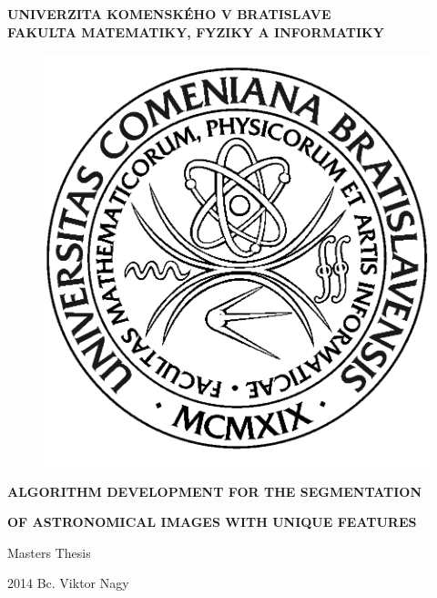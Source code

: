 \documentclass[12pt, a4paper, oneside]{book}
\newcommand\mfthesistype{Masters Thesis}
\newcommand\mfauthor{Bc. Viktor Nagy}
\newcommand\mfuniversity{UNIVERZITA KOMENSKÉHO V BRATISLAVE}
\newcommand\mffaculty{FAKULTA MATEMATIKY, FYZIKY A INFORMATIKY}
\begin{document}
\frontmatter

\thispagestyle{empty}

\noindent
\begin{minipage}{\textwidth}
\begin{center}
\textbf{\mfuniversity \\
\mffaculty}
\end{center}
\end{minipage}

\vfill
\begin{figure}[!hbt]
    \begin{center}
        \includegraphics{images/logo_fmph}
        \label{img:logo}
    \end{center}
\end{figure}
\begin{center}
    \begin{minipage}{0.8\textwidth}
        \centerline{\textbf{\Large\MakeUppercase{Algorithm development for the segmentation}}}
        \centerline{\textbf{\Large\MakeUppercase{of astronomical images with unique features}}}
        \smallskip
        \centerline{\mfthesistype}
    \end{minipage}
\end{center}
\vfill
2014 \hfill
\mfauthor
\eject
\end{document}
